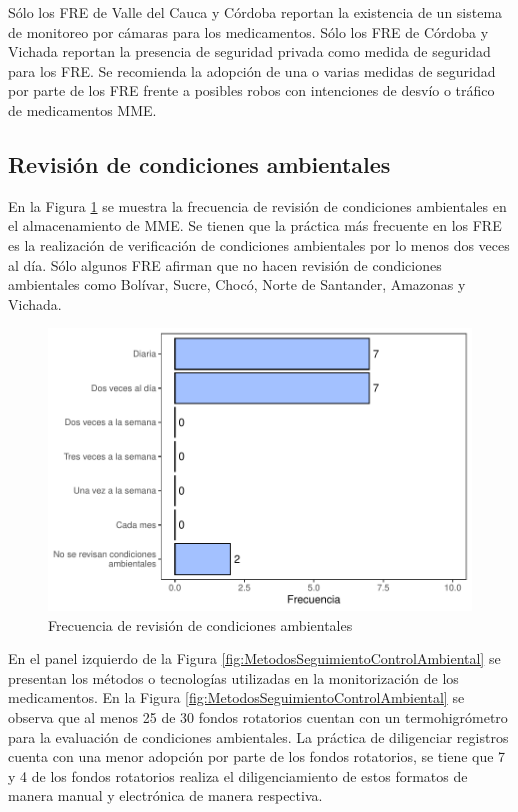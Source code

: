 \documentclass[
]{book}
\begin{document}
Sólo los FRE de Valle del Cauca y Córdoba reportan la existencia de un sistema de monitoreo por cámaras para los medicamentos. Sólo los FRE de Córdoba y Vichada reportan la presencia de seguridad privada como medida de seguridad para los FRE. Se recomienda la adopción de una o varias medidas de seguridad por parte de los FRE frente a posibles robos con intenciones de desvío o tráfico de medicamentos MME.

\hypertarget{revisiuxf3n-de-condiciones-ambientales}{%
\subsection{Revisión de condiciones ambientales}\label{revisiuxf3n-de-condiciones-ambientales}}

En la Figura \ref{fig:FrecRevCondiciones} se muestra la frecuencia de revisión de condiciones ambientales en el almacenamiento de MME. Se tienen que la práctica más frecuente en los FRE es la realización de verificación de condiciones ambientales por lo menos dos veces al día. Sólo algunos FRE afirman que no hacen revisión de condiciones ambientales como Bolívar, Sucre, Chocó, Norte de Santander, Amazonas y Vichada.

\begin{figure}
\includegraphics[width=0.85\linewidth]{InformeFinal_files/figure-latex/FrecRevCondiciones-1} \caption{Frecuencia de revisión de condiciones ambientales}\label{fig:FrecRevCondiciones}
\end{figure}

En el panel izquierdo de la Figura \ref{fig:MetodosSeguimientoControlAmbiental} se presentan los métodos o tecnologías utilizadas en la monitorización de los medicamentos. En la Figura \ref{fig:MetodosSeguimientoControlAmbiental} se observa que al menos 25 de 30 fondos rotatorios cuentan con un termohigrómetro para la evaluación de condiciones ambientales. La práctica de diligenciar registros cuenta con una menor adopción por parte de los fondos rotatorios, se tiene que 7 y 4 de los fondos rotatorios realiza el diligenciamiento de estos formatos de manera manual y electrónica de manera respectiva.
\end{document}
